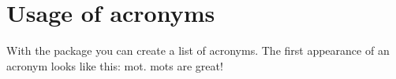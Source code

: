 \cleardoublepage
\chapter{Usage of acronyms}\label{app:zernike}

With the  package you can create a list of acronyms. The first appearance of an acronym looks like this: \gls{mot}. \Glspl{mot} are great!